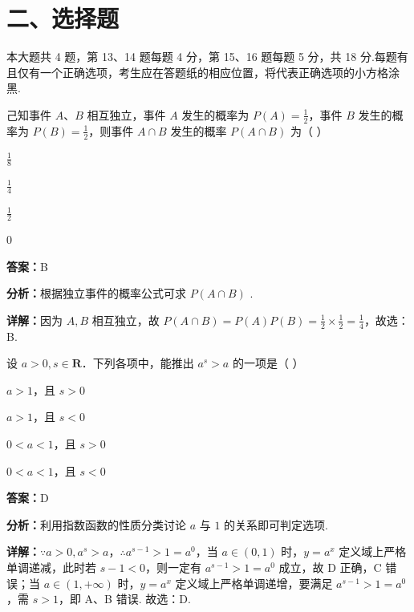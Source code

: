 \section*{二、选择题}
本大题共 4 题，第 13、14 题每题 4 分，第 15、16 题每题 5 分，共 18 分.每题有且仅有一个正确选项，考生应在答题纸的相应位置，将代表正确选项的小方格涂黑.

\begin{question}[points=4]
己知事件 $A$、$B$ 相互独立，事件 $A$ 发生的概率为 $P(A) = \frac{1}{2}$，事件 $B$ 发生的概率为 $P(B) = \frac{1}{2}$，则事件 $A \cap B$ 发生的概率 $P(A \cap B)$ 为（ ）
\begin{choices}
  \item $\frac{1}{8}$
  \item $\frac{1}{4}$
  \item $\frac{1}{2}$
  \item $0$
\end{choices}
\begin{solution}
\textbf{答案：}B

\textbf{分析：}根据独立事件的概率公式可求 $P(A \cap B)$ .

\textbf{详解：}因为 $A, B$ 相互独立，故 $P(A \cap B) = P(A)P(B) = \frac{1}{2} \times \frac{1}{2} = \frac{1}{4}$，故选：B.
\end{solution}
\end{question}

\begin{question}[points=4]
设 $a > 0, s \in \mathbf{R}$．下列各项中，能推出 $a^s > a$ 的一项是（ ）
\begin{choices}
  \item $a > 1$，且 $s > 0$
  \item $a > 1$，且 $s < 0$
  \item $0 < a < 1$，且 $s > 0$
  \item $0 < a < 1$，且 $s < 0$
\end{choices}
\begin{solution}
\textbf{答案：}D

\textbf{分析：}利用指数函数的性质分类讨论 $a$ 与 $1$ 的关系即可判定选项.

\textbf{详解：}$\because a > 0, a^s > a$，$\therefore a^{s-1} > 1 = a^0$，当 $a \in (0,1)$ 时，$y = a^x$ 定义域上严格单调递减，此时若 $s-1 < 0$，则一定有 $a^{s-1} > 1 = a^0$ 成立，故 D 正确，C 错误；当 $a \in (1, +\infty)$ 时，$y = a^x$ 定义域上严格单调递增，要满足 $a^{s-1} > 1 = a^0$，需 $s > 1$，即 A、B 错误. 故选：D.
\end{solution}
\end{question}

